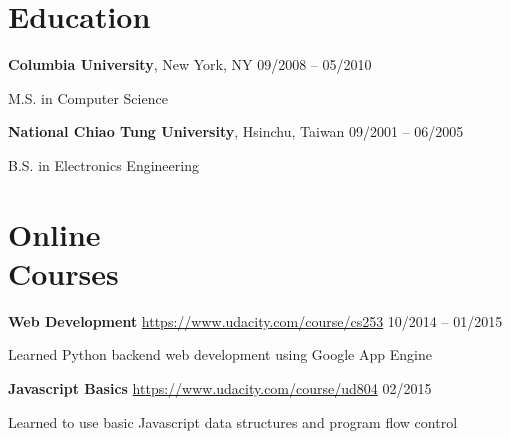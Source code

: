 \documentclass[margin,line]{resume}
\begin{document}
\begin{resume}
    \section{\myheadingstyle Education}

    \textbf{Columbia University}, New York, NY \hfill 09/2008 -- 05/2010 \vspace{-3mm}\\\vspace{-1mm}%
      \begin{list2}
       \item M.S. in Computer Science
      \end{list2}
    \vspace{-1mm}
 
    \textbf{National Chiao Tung University}, Hsinchu, Taiwan \hfill 09/2001 -- 06/2005 \vspace{-3mm}\\\vspace{-1mm}%
      \begin{list2}
       \item B.S. in Electronics Engineering
      \end{list2}
    \vspace{-1mm}

    \section{\myheadingstyle Online \\ Courses}

    \textbf{Web Development} \url{https://www.udacity.com/course/cs253} \hfill 10/2014 -- 01/2015 \vspace{-3mm}\\\vspace{-1mm}%
      \begin{list2}
       \item Learned Python backend web development using Google App Engine
      \end{list2}
    \vspace{-2mm}

    \textbf{Javascript Basics} \url{https://www.udacity.com/course/ud804} \hfill 02/2015 \vspace{-3mm}\\\vspace{-1mm}%
      \begin{list2}
       \item Learned to use basic Javascript data structures and program flow control
      \end{list2}
    \vspace{-2mm}


\end{resume}
\end{document}
